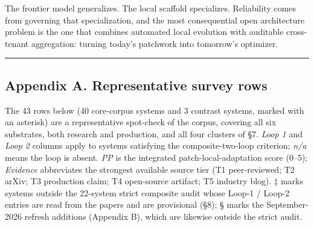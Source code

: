 \documentclass[
]{article}
\begin{document}
The frontier model generalizes. The local scaffold specializes.
Reliability comes from governing that specialization, and the most
consequential open architecture problem is the one that combines
automated local evolution with auditable cross-tenant aggregation:
turning today's patchwork into tomorrow's optimizer.

\begin{center}\rule{0.5\linewidth}{0.5pt}\end{center}

\subsection{Appendix A. Representative survey
rows}\label{appendix-a.-representative-survey-rows}

The 43 rows below (40 core-corpus systems and 3 contrast systems, marked
with an asterisk) are a representative spot-check of the corpus,
covering all six substrates, both research and production, and all four
clusters of §7. \emph{Loop 1} and \emph{Loop 2} columns apply to systems
satisfying the composite-two-loop criterion; \emph{n/a} means the loop
is absent. \emph{PP} is the integrated patch-local-adaptation score
(0--5); \emph{Evidence} abbreviates the strongest available source tier
(T1 peer-reviewed; T2 arXiv; T3 production claim; T4 open-source
artifact; T5 industry blog). ‡ marks systems outside the 22-system
strict composite audit whose Loop-1 / Loop-2 entries are read from the
papers and are provisional (§8); § marks the September-2026 refresh
additions (Appendix B), which are likewise outside the strict audit.

\begingroup\small
\end{document}
